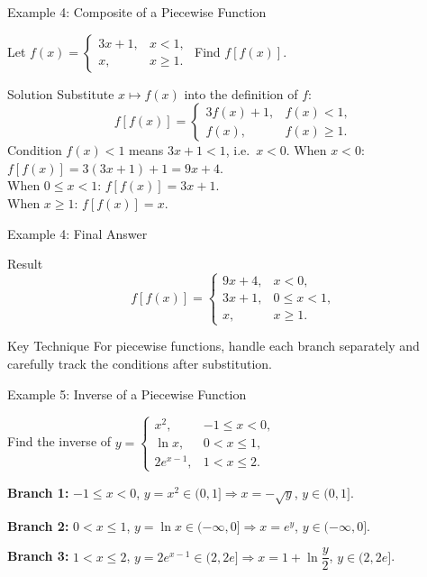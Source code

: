 \documentclass[aspectratio=169,10pt]{beamer}
\begin{document}
\begin{frame}{Example 4: Composite of a Piecewise Function}
  \begin{example}
    Let $f(x)=\begin{cases}3x+1, & x<1,\\ x, & x\ge 1.\end{cases}$
    Find $f[f(x)]$.
  \end{example}
  \pause
  \begin{block}{Solution}
    Substitute $x\mapsto f(x)$ into the definition of $f$:
    \[
      f[f(x)] =
      \begin{cases}
        3f(x)+1, & f(x)<1,\\
        f(x),     & f(x)\ge 1.
      \end{cases}
    \]
    \pause
    Condition $f(x)<1$ means $3x+1<1$, i.e.\ $x<0$.
    \pause
    When $x<0$: $f[f(x)]=3(3x+1)+1=9x+4$.\\
    When $0\le x<1$: $f[f(x)]=3x+1$.\\
    When $x\ge 1$: $f[f(x)]=x$.
  \end{block}
\end{frame}

\begin{frame}{Example 4: Final Answer}
  \begin{block}{Result}
    \[
      f[f(x)] =
      \begin{cases}
        9x+4,   & x<0,\\
        3x+1,   & 0\le x<1,\\
        x,      & x\ge 1.
      \end{cases}
    \]
  \end{block}
  \pause
  \begin{block}{Key Technique}
    For piecewise functions, handle each branch separately and carefully track the conditions after substitution.
  \end{block}
\end{frame}

\begin{frame}{Example 5: Inverse of a Piecewise Function}
  \begin{example}
    Find the inverse of
    $y=\begin{cases}x^2, & -1\le x<0,\\ \ln x, & 0<x\le 1,\\ 2e^{x-1}, & 1<x\le 2.\end{cases}$
  \end{example}
  \pause
  \textbf{Branch 1:} $-1\le x<0$, $y=x^2\in(0,1]$\quad$\Rightarrow$\quad $x=-\sqrt{y}$, $y\in(0,1]$.
  \pause

  \textbf{Branch 2:} $0<x\le 1$, $y=\ln x\in(-\infty,0]$\quad$\Rightarrow$\quad $x=e^{y}$, $y\in(-\infty,0]$.
  \pause

  \textbf{Branch 3:} $1<x\le 2$, $y=2e^{x-1}\in(2,2e]$\quad$\Rightarrow$\quad $x=1+\ln\dfrac{y}{2}$, $y\in(2,2e]$.
\end{frame}
\end{document}
